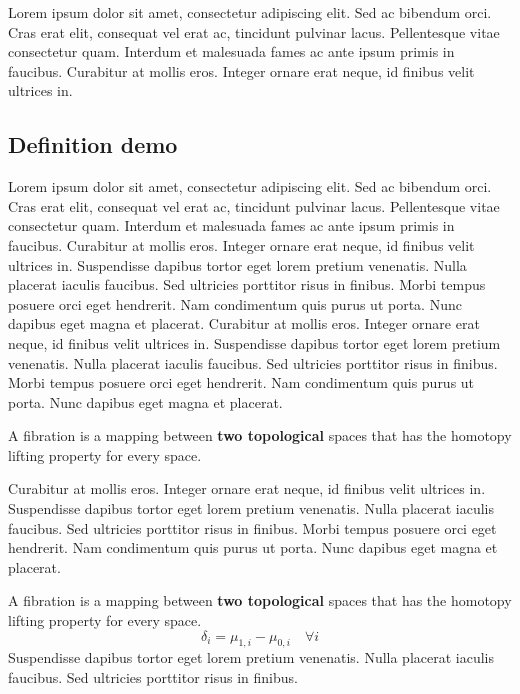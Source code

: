 \documentclass[./main.tex]{subfiles}
\begin{document}
\par Lorem ipsum dolor sit amet, consectetur adipiscing elit. Sed ac bibendum orci. Cras erat elit, consequat vel erat ac, tincidunt pulvinar lacus. Pellentesque vitae consectetur quam. Interdum et malesuada fames ac ante ipsum primis in faucibus. Curabitur at mollis eros. Integer ornare erat neque, id finibus velit ultrices in.

\subsection{Definition demo}

\par Lorem ipsum dolor sit amet, consectetur adipiscing elit. Sed ac bibendum orci. Cras erat elit, consequat vel erat ac, tincidunt pulvinar lacus. Pellentesque vitae consectetur quam. Interdum et malesuada fames ac ante ipsum primis in faucibus. Curabitur at mollis eros. Integer ornare erat neque, id finibus velit ultrices in. Suspendisse dapibus tortor eget lorem pretium venenatis. Nulla placerat iaculis faucibus. Sed ultricies porttitor risus in finibus. Morbi tempus posuere orci eget hendrerit. Nam condimentum quis purus ut porta. Nunc dapibus eget magna et placerat. Curabitur at mollis eros. Integer ornare erat neque, id finibus velit ultrices in. Suspendisse dapibus tortor eget lorem pretium venenatis. Nulla placerat iaculis faucibus. Sed ultricies porttitor risus in finibus. Morbi tempus posuere orci eget hendrerit. Nam condimentum quis purus ut porta. Nunc dapibus eget magna et placerat.

\begin{problem}[Demarcation]
    A fibration is a mapping between \textbf{two topological} spaces that has the homotopy lifting property for every space.
\end{problem}

\par Curabitur at mollis eros. Integer ornare erat neque, id finibus velit ultrices in. Suspendisse dapibus tortor eget lorem pretium venenatis. Nulla placerat iaculis faucibus. Sed ultricies porttitor risus in finibus. Morbi tempus posuere orci eget hendrerit. Nam condimentum quis purus ut porta. Nunc dapibus eget magna et placerat.

\begin{assumption}
    A fibration is a mapping between \textbf{two topological} spaces that has the homotopy lifting property for every space.
    \begin{equation*} %
    		\delta_{i} = \mu_{1, i} - \mu_{0, i} \quad \forall i 
    \end{equation*}
    Suspendisse dapibus tortor eget lorem pretium venenatis. Nulla placerat iaculis faucibus. Sed ultricies porttitor risus in finibus.
    \label{assump:01}
\end{assumption}
\end{document}
